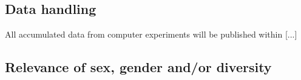 \documentclass[a4paper,11pt]{article}
\begin{document}

\subsection{Data handling}

All accumulated data from computer experiments will be published within [...]

%

\subsection{Relevance of sex, gender and/or diversity}
%
\end{document}
